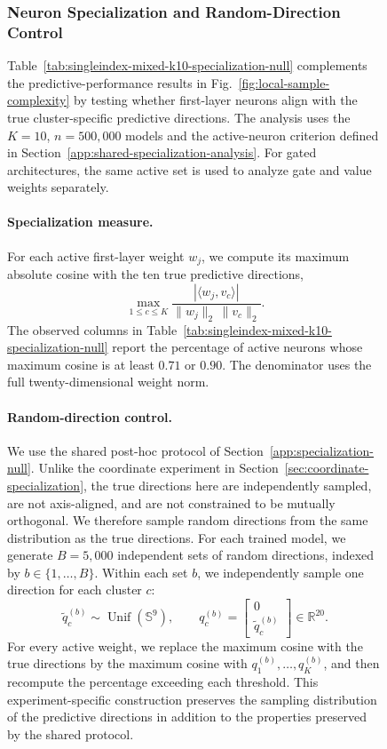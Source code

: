 \documentclass{article}
\newcounter{model}[section]
\begin{document}
\begin{figure}
\subsubsection{Neuron Specialization and Random-Direction Control}
\label{app:singleindex-specialization-null}

Table~\ref{tab:singleindex-mixed-k10-specialization-null} complements the
predictive-performance results in Fig.~\ref{fig:local-sample-complexity} by
testing whether first-layer neurons align with the true cluster-specific
predictive directions. The analysis uses the \(K=10\), \(n=500{,}000\)
models and the active-neuron criterion defined in
Section~\ref{app:shared-specialization-analysis}. For gated architectures, the
same active set is used to analyze gate and value weights separately.

\paragraph{Specialization measure.}
For each active first-layer weight \(w_j\), we compute its maximum absolute
cosine with the ten true predictive directions,
\[
    \max_{1\leq c\leq K}
    \frac{|\langle w_j,v_c\rangle|}
    {\|w_j\|_2\,\|v_c\|_2}.
\]
The observed columns in
Table~\ref{tab:singleindex-mixed-k10-specialization-null} report the percentage
of active neurons whose maximum cosine is at least \(0.71\) or \(0.90\).
The denominator uses the full twenty-dimensional weight norm.

\paragraph{Random-direction control.}
We use the shared post-hoc protocol of
Section~\ref{app:specialization-null}. Unlike the coordinate experiment in
Section~\ref{sec:coordinate-specialization}, the true directions here are
independently sampled, are not axis-aligned, and are not constrained to be
mutually orthogonal. We therefore sample random directions from the same
distribution as the true directions. For each trained model, we generate
\(B=5{,}000\) independent sets of random directions, indexed by
\(b\in\{1,\ldots,B\}\). Within each set \(b\), we independently sample one
direction for each cluster \(c\):
\[
    \widetilde q_c^{(b)}\sim\operatorname{Unif}(\mathbb S^9),
    \qquad
    q_c^{(b)}
    =
    \begin{bmatrix}
        0\\
        \widetilde q_c^{(b)}
    \end{bmatrix}
    \in\mathbb R^{20}.
\]
For every active weight, we replace the maximum cosine with the true
directions by the maximum cosine with
\(q_1^{(b)},\ldots,q_K^{(b)}\), and then recompute the percentage exceeding
each threshold. This experiment-specific construction preserves the sampling
distribution of the predictive directions in addition to the properties
preserved by the shared protocol.


\end{figure}
\end{document}
